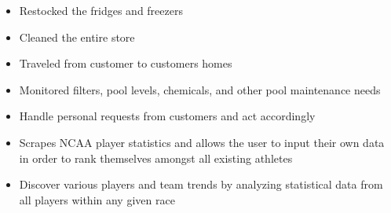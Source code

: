 \documentclass[10pt,a4paper,ragged2e,withhyper]{altacv}
\begin{document}
\begin{paracol}{2}

\begin{itemize}
\item Restocked the fridges and freezers
\item Cleaned the entire store
\end{itemize}

\divider

\begin{itemize}
\item Traveled from customer to customers homes
\item Monitored filters, pool levels, chemicals, and other pool maintenance needs
\item Handle personal requests from customers and act accordingly
\end{itemize}


\begin{itemize}
\item Scrapes NCAA player statistics and allows the user to input their own data in order to rank themselves amongst all existing athletes
\item Discover various players and team trends by analyzing statistical data from all players within any given race
\end{itemize}

\divider


\medskip



\divider


\divider



 

\end{paracol}
\end{document}

